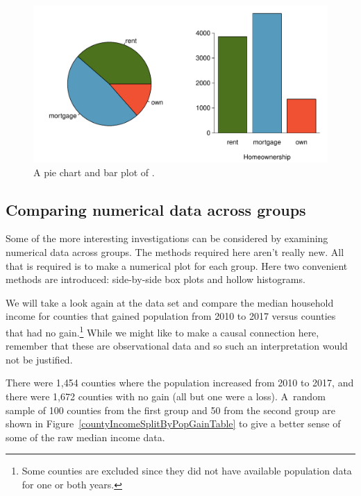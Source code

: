 \begin{figure}[h]
   \centering
   \includegraphics[width=\textwidth]{ch_summarizing_data/figures/loan_homeownership_pie_chart/loan_homeownership_pie_chart}
   \caption{A pie chart and bar plot of .}
   \label{loan_homeownership_pie_chart}
\end{figure}


\subsection{Comparing numerical data across groups}
\label{comparingAcrossGroups}


Some of the more interesting investigations can be considered
by examining numerical data across groups.
The methods required here aren't really new.
All that is required is to make a numerical plot for each group.
Here two convenient methods are introduced: side-by-side
box plots and hollow histograms.

We will take a look again at the  data set
and compare the median household income for counties that
gained population from 2010 to 2017 versus counties that
had no gain.\footnote{Some counties are excluded since
  they did not have available population data for one
  or both years.}
While we might like to make a causal connection here,
remember that these are observational data and so such
an interpretation would not be justified.

\newcommand{\numcountieswithgains}{1454}
\newcommand{\numcountieswithgainsC}{1,454}
\newcommand{\numcountieswithoutgains}{1672}
\newcommand{\numcountieswithoutgainsC}{1,672}

There were \numcountieswithgainsC{} counties where
the population increased from 2010 to 2017, and there
were \numcountieswithoutgainsC{} counties with no gain
(all but one were a loss).
A~random sample of 100 counties from the first group and
50 from the second group are shown in
Figure~\ref{countyIncomeSplitByPopGainTable}
to give a better sense of some of the raw median
income data.


